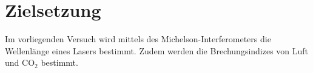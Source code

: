 \section{Zielsetzung}
\label{sec:Zielsetzung}
Im vorliegenden Versuch wird mittels des Michelson-Interferometers die Wellenlänge eines Lasers bestimmt. Zudem werden die Brechungsindizes von Luft und $\mathrm{CO_2}$ bestimmt.
